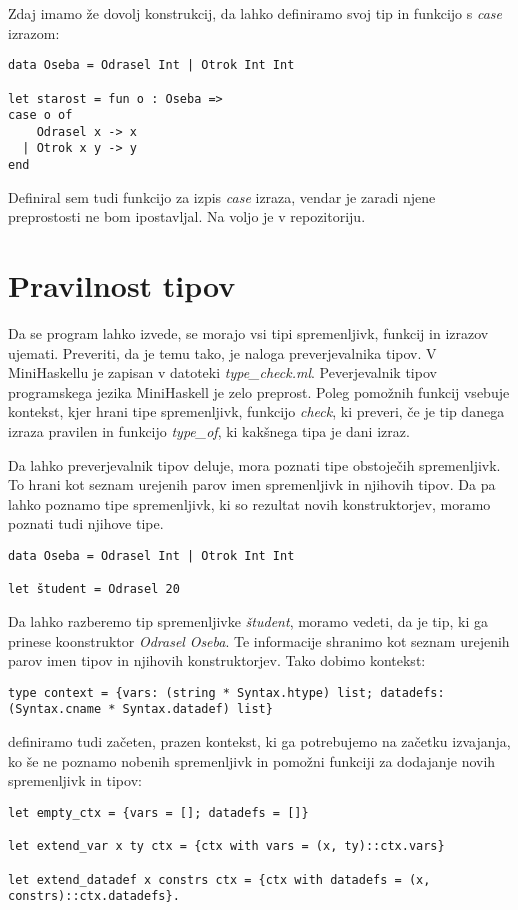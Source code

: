\documentclass[12pt,a4paper,openany]{book}
\begin{document}
Zdaj imamo že dovolj konstrukcij, da lahko definiramo svoj tip in funkcijo s \emph{case} izrazom: 
\begin{lstlisting}
data Oseba = Odrasel Int | Otrok Int Int

let starost = fun o : Oseba => 
case o of 
    Odrasel x -> x 
  | Otrok x y -> y
end
\end{lstlisting}

Definiral sem tudi funkcijo za izpis \emph{case} izraza, vendar je zaradi njene preprostosti ne bom ipostavljal. Na voljo je v repozitoriju.

\section{Pravilnost tipov}
 Da se program lahko izvede, se morajo vsi tipi spremenljivk, funkcij in izrazov ujemati. Preveriti, da je temu tako, je naloga preverjevalnika tipov. V MiniHaskellu je zapisan v datoteki 
 \emph{type\_check.ml}. Peverjevalnik tipov programskega jezika MiniHaskell je zelo preprost. Poleg pomožnih funkcij vsebuje kontekst, kjer hrani tipe spremenljivk, funkcijo \emph{check}, 
 ki preveri, če je tip danega izraza pravilen in funkcijo \emph{type\_of}, ki kakšnega tipa je dani izraz.
 
 Da lahko preverjevalnik tipov deluje, mora poznati tipe obstoječih spremenljivk. To hrani kot seznam urejenih parov imen spremenljivk in njihovih tipov. Da pa lahko poznamo tipe spremenljivk, 
 ki so rezultat novih konstruktorjev, moramo poznati tudi njihove tipe.
 \begin{lstlisting}
data Oseba = Odrasel Int | Otrok Int Int

let študent = Odrasel 20
\end{lstlisting}
Da lahko razberemo tip spremenljivke \emph{študent}, moramo vedeti, da je tip, ki ga prinese koonstruktor \emph{Odrasel} \emph{Oseba}. Te informacije shranimo kot seznam urejenih parov imen 
tipov in njihovih konstruktorjev. Tako dobimo kontekst:
\begin{lstlisting}
type context = {vars: (string * Syntax.htype) list; datadefs: (Syntax.cname * Syntax.datadef) list}
\end{lstlisting}
definiramo tudi začeten, prazen kontekst, ki ga potrebujemo na začetku izvajanja, ko še ne poznamo nobenih spremenljivk in pomožni funkciji za dodajanje novih spremenljivk in tipov:
\begin{lstlisting}
let empty_ctx = {vars = []; datadefs = []}

let extend_var x ty ctx = {ctx with vars = (x, ty)::ctx.vars}

let extend_datadef x constrs ctx = {ctx with datadefs = (x, constrs)::ctx.datadefs}.
\end{lstlisting}
\end{document}
